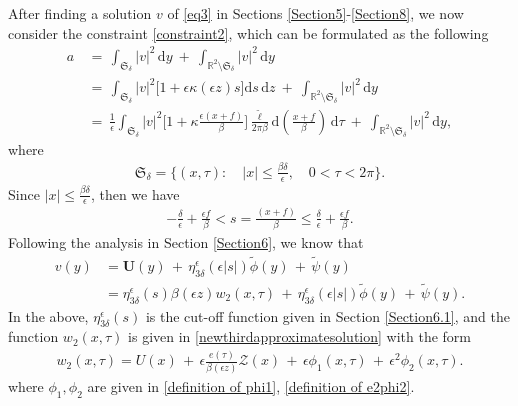 \documentclass[10pt, reqno]{amsart}
\numberwithin{equation}{section}
\theoremstyle{definition}
\begin{document}
{After finding a solution $v$ of \eqref{eq3} in Sections \ref{Section5}-\ref{Section8}, we now consider the constraint \eqref{constraint2},
which can be formulated as the following
\begin{align} \label{constraint6}
a & \,=\, \int_{ {\mathfrak S}_\delta} |v|^2\,{\mathrm d}y
\ +\
\int_{{\mathbb R}^2\setminus{\mathfrak S}_\delta} |v|^2\,{\mathrm d}y
\nonumber\\[2mm]
 & \,=\, \int_{{\mathfrak S}_\delta } |v|^2 \Big[1+ \epsilon\kappa(\epsilon z) s \Big] {\mathrm d} s\,{\mathrm d} z
 \ +\
\int_{{\mathbb R}^2\setminus {\mathfrak S}_\delta } |v|^2\,{\mathrm d}y
\nonumber\\[2mm]
 & \,=\,
\frac1\epsilon\int_{{\mathfrak S}_\delta} |v|^2 \Bigg[1+ \kappa \frac{\epsilon (x+f)} {\beta} \Bigg] \frac {\tilde \ell} {2\pi \beta}{\mathrm d} \left(\frac{ x+f} {\beta}\right)\,{\mathrm d}\tau
\ +\
\int_{{\mathbb R}^2\setminus{\mathfrak S}_\delta} |v|^2\,{\mathrm d}y,
\end{align}
where
\begin{align*}
{\mathfrak S}_\delta=\Bigg\{ (x, \tau): \quad |x| \le \frac {\beta \delta} \epsilon, \quad 0<\tau< 2\pi\Bigg\}.
\end{align*}
 Since $|x| \le  \frac {\beta \delta} \epsilon$, then we have
\begin{align} \label{out of delta}
 -\frac\delta \epsilon + \frac{\epsilon f} {\beta} < s= \frac{(x+f)} {\beta} \le \frac \delta \epsilon+ \frac{\epsilon f} {\beta}.
\end{align}
 Following the analysis in Section \ref{Section6}, we know that
\begin{align*}
 v(y) & = \mathbf{U}(y) \,+\, \eta_{3\delta}^{\epsilon}(\epsilon |s|){\tilde\phi}(y)
 \,+\, {\tilde\psi}(y)
\nonumber\\[2mm]
 &
 = \eta_{3\delta}^\epsilon(s) \beta(\epsilon z)w_2(x, \tau)
 \,+\, \eta_{3\delta}^{\epsilon}(\epsilon |s|){\tilde\phi}(y)
 \,+\, {\tilde\psi}(y).
\end{align*}
In the above, $ \eta_{3\delta}^\epsilon(s) $ is the cut-off function given in Section \ref{Section6.1}, and the function $w_2(x, \tau) $ is given in \eqref{newthirdapproximatesolution} with the form
\begin{align*}
w_2(x, \tau) = U(x) \,+\, \epsilon \frac{e(\tau)}{\beta(\epsilon z)} \mathcal Z(x) \,+\, \epsilon \phi_1(x, \tau) \,+\, \epsilon^2\phi_2(x, \tau).
\end{align*}
where $\phi_1, \phi_2$ are given in \eqref{definition of phi1}, \eqref{definition of e2phi2}.

}
\end{document}
